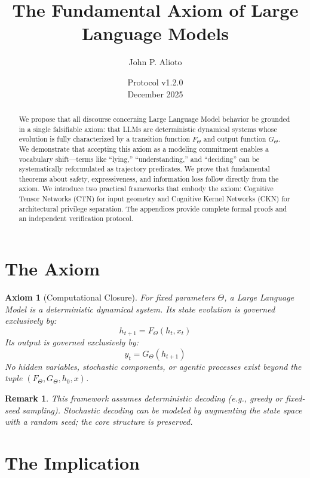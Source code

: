 \documentclass[11pt,a4paper]{article}
\title{The Fundamental Axiom of Large Language Models}
\author{John P. Alioto}
\date{Protocol v1.2.0\\December 2025}
\newtheorem{axiom}{Axiom}
\newtheorem*{remark}{Remark}
\begin{document}
\maketitle

\begin{abstract}
We propose that all discourse concerning Large Language Model behavior be grounded in a single falsifiable axiom: that LLMs are deterministic dynamical systems whose evolution is fully characterized by a transition function $F_\Theta$ and output function $G_\Theta$. We demonstrate that accepting this axiom as a modeling commitment enables a vocabulary shift---terms like ``lying,'' ``understanding,'' and ``deciding'' can be systematically reformulated as trajectory predicates. We prove that fundamental theorems about safety, expressiveness, and information loss follow directly from the axiom. We introduce two practical frameworks that embody the axiom: Cognitive Tensor Networks (CTN) for input geometry and Cognitive Kernel Networks (CKN) for architectural privilege separation. The appendices provide complete formal proofs and an independent verification protocol.
\end{abstract}

\section{The Axiom}

\begin{axiom}[Computational Closure]
For fixed parameters $\Theta$, a Large Language Model is a deterministic dynamical system. Its state evolution is governed exclusively by:
\begin{equation}
h_{t+1} = F_\Theta(h_t, x_t)
\end{equation}
Its output is governed exclusively by:
\begin{equation}
y_t = G_\Theta(h_{t+1})
\end{equation}
No hidden variables, stochastic components, or agentic processes exist beyond the tuple $(F_\Theta, G_\Theta, h_0, x)$.
\end{axiom}

\begin{remark}
This framework assumes deterministic decoding (e.g., greedy or fixed-seed sampling). Stochastic decoding can be modeled by augmenting the state space with a random seed; the core structure is preserved.
\end{remark}

\section{The Implication}
\end{document}
